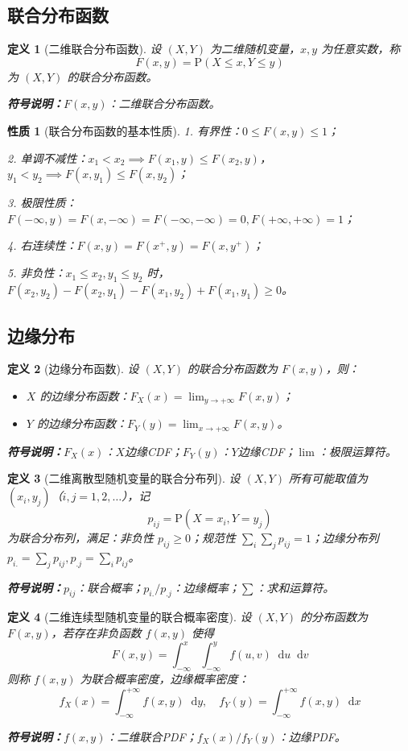 \documentclass[11pt,a4paper,oneside]{article}
\theoremstyle{yhbthm}
\newtheorem{definition}{定义}[section]
\newtheorem{property}{性质}[section]
\newcommand{\Prob}{\mathrm{P}}
\newcommand{\dif}{\mathop{}\!\mathrm{d}}
\newcommand{\symnote}[1]{\par\noindent\textbf{符号说明：}#1\par}
\begin{document}
\subsection{联合分布函数}
\begin{definition}[二维联合分布函数]
设 $(X,Y)$ 为二维随机变量，$x,y$ 为任意实数，称
$$
F(x,y) = \Prob(X \leq x, Y \leq y)
$$
为 $(X,Y)$ 的联合分布函数。
\symnote{$F(x,y)$：二维联合分布函数。}
\end{definition}

\begin{property}[联合分布函数的基本性质]
1. 有界性：$0 \le F(x,y) \le 1$；

2. 单调不减性：$x_1 < x_2 \implies F(x_1,y) \le F(x_2,y)$，$y_1 < y_2 \implies F(x,y_1) \le F(x,y_2)$；

3. 极限性质：$F(-\infty,y)=F(x,-\infty)=F(-\infty,-\infty)=0, F(+\infty,+\infty)=1$；

4. 右连续性：$F(x,y) = F(x^+,y) = F(x,y^+)$；

5. 非负性：$x_1 \le x_2, y_1 \le y_2$ 时，$F(x_2,y_2) - F(x_2,y_1) - F(x_1,y_2) + F(x_1,y_1) \ge 0$。
\end{property}

\subsection{边缘分布}
\begin{definition}[边缘分布函数]
设 $(X,Y)$ 的联合分布函数为 $F(x,y)$，则：
\begin{itemize}
    \item $X$ 的边缘分布函数：$F_X(x) = \lim_{y \to +\infty} F(x,y)$；
    \item $Y$ 的边缘分布函数：$F_Y(y) = \lim_{x \to +\infty} F(x,y)$。
\end{itemize}
\symnote{$F_X(x)$：$X$边缘CDF；$F_Y(y)$：$Y$边缘CDF；$\lim$：极限运算符。}
\end{definition}

\begin{definition}[二维离散型随机变量的联合分布列]
设 $(X,Y)$ 所有可能取值为 $(x_i, y_j)$（$i,j=1,2,\dots$），记
$$
p_{ij} = \Prob(X = x_i, Y = y_j)
$$
为联合分布列，满足：非负性 $p_{ij} \ge 0$；规范性 $\sum_i \sum_j p_{ij} = 1$；边缘分布列 $p_{i.} = \sum_j p_{ij}, p_{.j} = \sum_i p_{ij}$。
\symnote{$p_{ij}$：联合概率；$p_{i.}/p_{.j}$：边缘概率；$\sum$：求和运算符。}
\end{definition}

\begin{definition}[二维连续型随机变量的联合概率密度]
设 $(X,Y)$ 的分布函数为 $F(x,y)$，若存在非负函数 $f(x,y)$ 使得
$$
F(x,y) = \int_{-\infty}^x \int_{-\infty}^y f(u,v)\dif u\dif v
$$
则称 $f(x,y)$ 为联合概率密度，边缘概率密度：
$$
f_X(x) = \int_{-\infty}^{+\infty} f(x,y)\dif y, \quad f_Y(y) = \int_{-\infty}^{+\infty} f(x,y)\dif x
$$
\symnote{$f(x,y)$：二维联合PDF；$f_X(x)/f_Y(y)$：边缘PDF。}
\end{definition}
\end{document}
